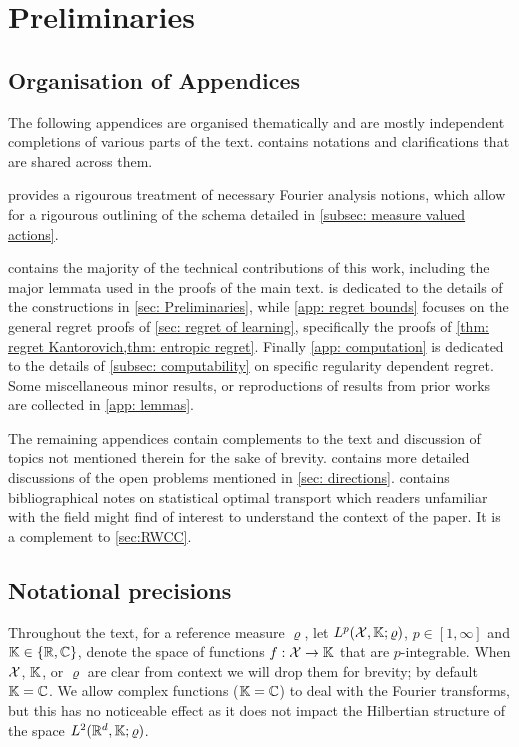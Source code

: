\section{Preliminaries}\label{app: intro}

\subsection{Organisation of Appendices}\label{subsec: organisation of appendices}

The following appendices are organised thematically and are mostly independent completions of various parts of the text.  contains notations and clarifications that are shared across them. 

 provides a rigourous treatment of necessary  Fourier analysis notions, which allow for a rigourous outlining of the schema detailed in \cref{subsec: measure valued actions}. 

 contains the majority of the technical contributions of this work, including the major lemmata used in the proofs of the main text.  is dedicated to the details of the constructions in \cref{sec: Preliminaries}, while \cref{app: regret bounds} focuses on the general regret proofs of \cref{sec: regret of learning}, specifically the proofs of \cref{thm: regret Kantorovich,thm: entropic regret}. Finally \cref{app: computation} is dedicated to the details of \cref{subsec: computability} on specific regularity dependent regret.
Some miscellaneous minor results, or reproductions of results from prior works are collected in \cref{app: lemmas}.

The remaining appendices contain complements to the text and discussion of topics not mentioned therein for the sake of brevity.  contains more detailed discussions of the open problems mentioned in \cref{sec: directions}.  contains bibliographical notes on statistical optimal transport which readers unfamiliar with the field might find of interest to understand the context of the paper. It is a complement to \cref{sec:RWCC}.


\subsection{Notational precisions}\label{subsec: notational precisions}

Throughout the text, for a reference measure $\varrho$, let $L^p(\mathcal{X},\mathbb{K} ;\varrho)$, $p\in[1,\infty]$ and $\mathbb{K}\in\{\mathbb{R},\mathbb{C}\}$, denote the space of functions $f:\mathcal{X}\to\mathbb{K}$ that are $p$-integrable. When $\mathcal{X}$, $\mathbb{K}$, or $\varrho$ are clear from context we will drop them for brevity; by default $\mathbb{K}=\mathbb{C}$. We allow complex functions ($\mathbb{K}=\mathbb{C}$) to deal with the Fourier transforms, but this has no noticeable effect as it does not impact the Hilbertian structure of the space $L^2(\mathbb{R}^d,\mathbb{K};\varrho)$. 

